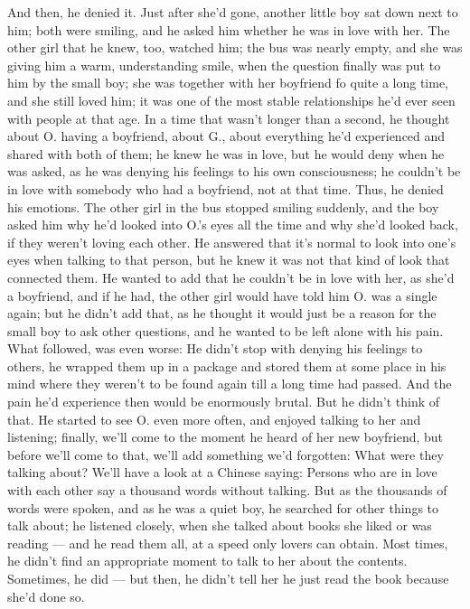 And then, he denied it. 
Just after she'd gone, another little boy sat down next to him; both were smiling, and he asked him whether he was in love with her. The other girl that he knew, too, watched him; the bus was nearly empty, and she was giving him a warm, understanding smile, when the question finally was put to him by the small boy; she was together with her boyfriend fo quite a long time, and she still loved him; it was one of the most stable relationships he'd ever seen with people at that age. In a time that wasn't longer than a second, he thought about O. having a boyfriend, about G., about everything he'd experienced and shared with both of them; he knew he was in love, but he would deny when he was asked, as he was denying his feelings to his own consciousness; he couldn't be in love with somebody who had a boyfriend, not at that time. 
Thus, he denied his emotions. 
The other girl in the bus stopped smiling suddenly, and the boy asked him why he'd looked into O.'s eyes all the time and why she'd looked back, if they weren't loving each other. 
He answered that it's normal to look into one's eyes when talking to that person, but he knew it was not that kind of look that connected them. He wanted to add that he couldn't be in love with her, as she'd a boyfriend, and if he had, the other girl would have told him O. was a single again; but he didn't add that, as he thought it would just be a reason for the small boy to ask other questions, and he wanted to be left alone with his pain. 
What followed, was even worse: He didn't stop with denying his feelings to others, he wrapped them up in a package and stored them at some place in his mind where they weren't to be found again till a long time had passed. 
And the pain he'd experience then would be enormously brutal. 
But he didn't think of that. 
He started to see O. even more often, and enjoyed talking to her and listening; finally, we'll come to the moment he heard of her new boyfriend, but before we'll come to that, we'll add something we'd forgotten: What were they talking about?
We'll have a look at a Chinese saying:
Persons who are in love with each other say a thousand words without talking. 
But as the thousands of words were spoken, and as he was a quiet boy, he searched for other things to talk about; he listened closely, when she talked about books she liked or was reading --- and he read them all, at a speed only lovers can obtain. 
Most times, he didn't find an appropriate moment to talk to her about the contents. 
Sometimes, he did --- but then, he didn't tell her he just read the book because she'd done so. 
